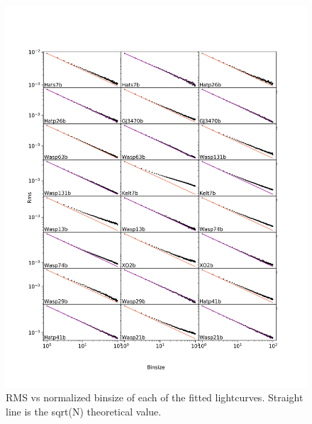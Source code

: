 \begin{subappendices}
  \begin{figure}
    \label{P1:fig:rmsvsbin}
    \includegraphics[width=\textwidth]{rmsVsbinsize0.pdf}
    \caption{RMS vs normalized binsize of each of the fitted lightcurves. Straight line is the sqrt(N) theoretical value.}
  \end{figure}


\end{subappendices}

